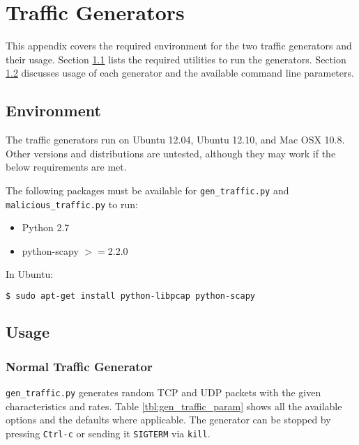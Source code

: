 \chapter{Traffic Generators}
\label{chp:generators}

\par This appendix covers the required environment for the two traffic generators and their usage. Section \ref{sec:gen_env} lists the required utilities to run the generators. Section \ref{sec:gen_usage} discusses usage of each generator and the available command line parameters.

\section{Environment}
\label{sec:gen_env}
\par The traffic generators run on Ubuntu 12.04, Ubuntu 12.10, and Mac OSX 10.8. Other versions and distributions are untested, although they may work if the below requirements are met. 

\par The following packages must be available for \texttt{gen\_traffic.py} and \texttt{malicious\_traffic.py} to run:

{\singlespace
\begin{itemize}
\item Python 2.7
\item python-scapy $>=$2.2.0
\end{itemize}
}

\par In Ubuntu:
\begin{lstlisting}[language=bash]
$ sudo apt-get install python-libpcap python-scapy
\end{lstlisting}

\section{Usage}
\label{sec:gen_usage}
\subsection{Normal Traffic Generator}
\par \texttt{gen\_traffic.py} generates random \ac{TCP} and \ac{UDP} packets with the given characteristics and rates. Table \ref{tbl:gen_traffic_param} shows all the available options and the defaults where applicable. The generator can be stopped by pressing \texttt{Ctrl-c} or sending it \texttt{SIGTERM} via \texttt{kill}.

